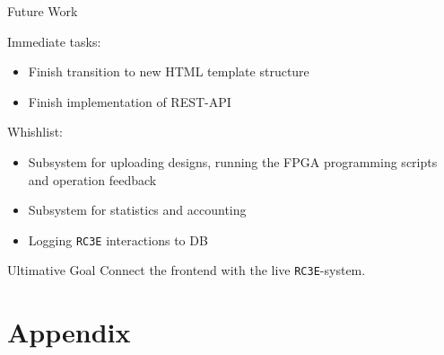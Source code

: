 \documentclass{beamer}
\newcommand{\rccce}{\texttt{RC3E}}
\begin{document}
    \begin{frame}{Future Work}
    
        Immediate tasks:
        \begin{itemize}
            \item Finish transition to new HTML template structure
            \item Finish implementation of REST-API
        \end{itemize}
        
        Whishlist:
        \begin{itemize}
            \item Subsystem for uploading designs, running the FPGA programming scripts and operation feedback
            \item Subsystem for statistics and accounting
            \item Logging \rccce{} interactions to DB
        \end{itemize}

        \begin{block}{Ultimative Goal}
            Connect the frontend with the live \rccce -system.
        \end{block}
     
    \end{frame}

\appendix
\section{Appendix}
\end{document}
